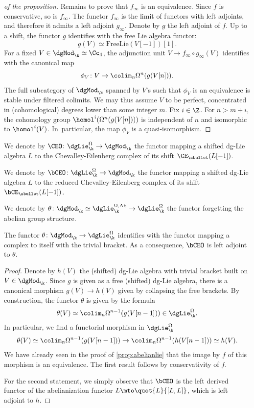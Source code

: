 \begin{proof}[of the proposition]
Remains to prove that $f_\infty$ is an equivalence. Since $f$ is conservative, so is $f_\infty$. The functor $f_\infty$ is the limit of functors with left adjoints, and therefore it admits a left adjoint $g_\infty$. Denote by $g$ the left adjoint of $f$. Up to a shift, the functor $g$ identifies with the free Lie algebra functor:
\[
g(V) \simeq \mathrm{FreeLie}(V[-1]) [1].
\]
For a fixed $V \in \dgMod_\k \simeq \Cc_4$, the adjunction unit $V \to f_\infty \circ g_\infty(V)$ identifies with the canonical map
\[
\phi_V \colon V \to \colim_n \Omega^{n}(g(V[n])).
\]
The full subcategory of $\dgMod_\k$ spanned by $V$'s such that $\phi_V$ is an equivalence is stable under filtered colimits. We may thus assume $V$ to be perfect, concentrated in (cohomological) degrees lower than some integer $m$.
Fix $i \in \Z$. For $n > m + i$, the cohomology group $\homol^i(\Omega^{n}(g(V[n])))$ is independent of $n$ and isomorphic to $\homol^i(V)$. In~particular, the map $\phi_V$ is a quasi-isomorphism.
\end{proof}

\begin{df}
We denote by $\CEO \colon \dgLie_\k^\Omega \to \dgMod_\k$ the functor mapping a shifted dg-Lie algebra $L$ to the Chevalley-Eilenberg complex of its shift $\CE_\sbullet(L[-1])$.

We denote by $\bCEO \colon \dgLie_\k^\Omega \to \dgMod_\k$ the functor mapping a shifted dg-Lie algebra $L$ to the reduced Chevalley-Eilenberg complex of its shift $\bCE_\sbullet(L[-1])$.
\end{df}
\begin{df}
We denote by $\theta \colon \dgMod_\k \simeq \dgLie_\k^{\Omega,\mathrm{Ab}} \to \dgLie_\k^{\Omega}$ the functor forgetting the abelian group structure.
\end{df}

\begin{lem}
The functor $\theta \colon \dgMod_\k \to \dgLie_\k^\Omega$ identifies with the functor mapping a complex to itself with the trivial bracket.
As a consequence, $\bCEO$ is left adjoint to $\theta$.
\end{lem}
\begin{proof}
Denote by $h(V)$ the (shifted) dg-Lie algebra with trivial bracket built on $V \in \dgMod_\k$.
Since $g$ is given as a free (shifted) dg-Lie algebra, there is a canonical morphism $g(V) \to h(V)$ given by collapsing the free brackets.
By construction, the functor $\theta$ is given by the formula
\[
\theta(V) \simeq \colim_n \Omega^{n-1}(g(V[n-1])) \in \dgLie_\k^\Omega.
\]
In particular, we find a functorial morphism in $\dgLie_\k^\Omega$
\[
\theta(V) \simeq \colim_n \Omega^{n-1}(g(V[n-1])) \to \colim_n \Omega^{n-1}(h(V[n-1])) \simeq h(V).
\]
We have already seen in the proof of \autoref{prop:abelianlie} that the image by $f$ of this morphism is an equivalence. The first result follows by conservativity of $f$.

For the second statement, we simply observe that $\bCEO$ is the left derived functor of the abelianization functor $L \mto \quot{L}{[L,L]}$, which is left adjoint to $h$.
\end{proof}

